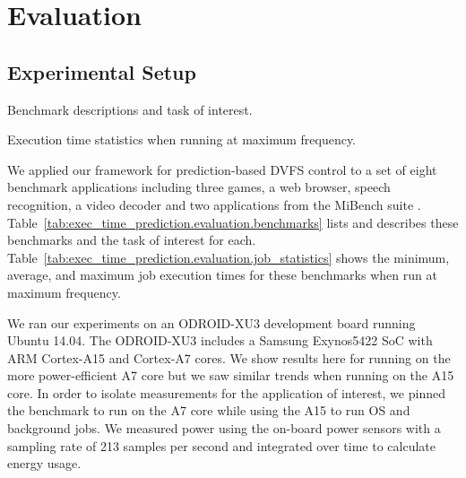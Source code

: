 \section{Evaluation}
\label{sec:exec_time_prediction.evaluation}

\subsection{Experimental Setup}
\label{sec:exec_time_prediction.evaluation.setup}

\begin{table}
  \begin{center}
    \begin{footnotesize}
    
    \end{footnotesize}
    \caption{Benchmark descriptions and task of interest.}
    \label{tab:exec_time_prediction.evaluation.benchmarks}
  \end{center}
\end{table}

\begin{table}
  \begin{center}
    \begin{footnotesize}
    
    \end{footnotesize}
    \caption{Execution time statistics when running
    at maximum frequency.}
    \label{tab:exec_time_prediction.evaluation.job_statistics}
  \end{center}
\end{table}

We applied our framework for prediction-based DVFS control to a set of eight
benchmark applications including three games, a web browser, speech
recognition, a video decoder and two applications from the MiBench suite
\cite{mibench}.  Table~\ref{tab:exec_time_prediction.evaluation.benchmarks}
lists and describes these benchmarks and the task of interest for each.
Table~\ref{tab:exec_time_prediction.evaluation.job_statistics} shows the
minimum, average, and maximum job execution times for these benchmarks when run
at maximum frequency.

We ran our experiments on an ODROID-XU3 \cite{odroid} development board running
Ubuntu 14.04. The ODROID-XU3 includes a Samsung Exynos5422 SoC with ARM
Cortex-A15 and Cortex-A7 cores. We show results here for running on the more
power-efficient A7 core but we saw similar trends when running on the A15 core.
In order to isolate measurements for the application of interest, we pinned the
benchmark to run on the A7 core while using the A15 to run OS and background
jobs. We measured power using the on-board power sensors with a sampling rate
of 213 samples per second and integrated over time to calculate energy usage.

